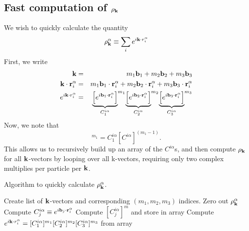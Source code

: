 \documentclass{article}
\begin{document}
\subsection{Fast computation of $\rho_{\mathbf{k}}$}
We wish to quickly calculate the quantity
\begin{equation}
\rho_{\mathbf{k}}^\alpha \equiv \sum_i e^{i\mathbf{k} \cdot r_i^\alpha}
\end{equation}
First, we write 
\begin{eqnarray}
\mathbf{k} & = & m_1 \mathbf{b}_1 + m_2 \mathbf{b}_2 + m_3 \mathbf{b}_3 \\
\mathbf{k} \cdot \mathbf{r}_i^\alpha & = &  m_1 \mathbf{b}_1 \cdot \mathbf{r}_i^\alpha + 
m_2 \mathbf{b}_2 \cdot \mathbf{r}_i^\alpha + m_3 \mathbf{b}_3 \cdot \mathbf{r}_i^\alpha \\
e^{i\mathbf{k} \cdot r_i^\alpha} & = & 
{\underbrace{\left[e^{i \mathbf{b}_1 \cdot\mathbf{r}_i^\alpha}\right]}_{C^{i\alpha}_1}}^{m_1}
{\underbrace{\left[e^{i \mathbf{b}_2 \cdot\mathbf{r}_i^\alpha}\right]}_{C^{i\alpha}_2}}^{m_2}
{\underbrace{\left[e^{i \mathbf{b}_3 \cdot\mathbf{r}_i^\alpha}\right]}_{C^{i\alpha}_3}}^{m_3}
\end{eqnarray}
Now, we note that
\begin{equation}
[C^{i\alpha}_1]^{m_1} = C^{i\alpha}_1 [C^{i\alpha}]^{(m_1-1)}.
\end{equation}
This allows us to recursively build up an array of the $C^{i\alpha}$s,
and then compute $\rho_{\mathbf{k}}$ for all $\mathbf{k}$-vectors by looping over all
k-vectors, requiring only two complex multiplies per particle per
$\mathbf{k}$.
\begin{algorithm}
\caption{Algorithm to quickly calculate $\rho_{\mathbf{k}}^\alpha$.}
\begin{algorithmic}
\STATE Create list of $\mathbf{k}$-vectors and corresponding $(m_1, m_2,
m_3)$ indices.
  \STATE Zero out $\rho_{\mathbf{k}}^\alpha$
      \STATE Compute $C^{i \alpha}_j \equiv e^{i \mathbf{b}_j \cdot
        \mathbf{r}^{\alpha}_i}$
         \STATE Compute $[C^{i \alpha}_j]^m$ and store in array
       \ENDFOR
    \ENDFOR
       \STATE Compute $e^{i \mathbf{k} \cdot r^\alpha_i} =
         [C^{i\alpha}_1]^{m_1} [C^{i\alpha}_2]^{m_2}
         [C^{i\alpha}_3]^{m_3}$ from array
    \ENDFOR
  \ENDFOR
\ENDFOR
\end{algorithmic}
\end{algorithm}
\end{document}

